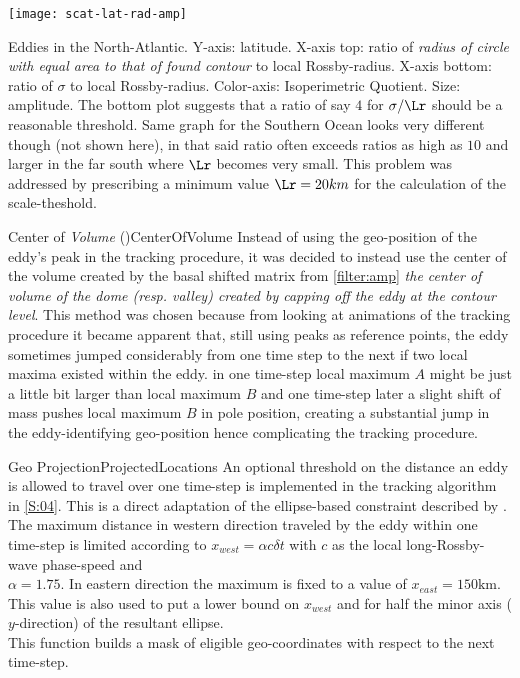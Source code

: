 \begin{marginfigure}
	\texttt{[image: scat-lat-rad-amp]}
	\caption{Eddies in the North-Atlantic. Y-axis: latitude. X-axis top: ratio of \textit{radius of circle with equal area to that of found contour} to local Rossby-radius.  X-axis bottom: ratio of $\sigma$ to local Rossby-radius. Color-axis: Isoperimetric Quotient. Size: amplitude. The bottom plot suggests that a ratio of say $4$ for $\sigma/\Lr$ should be a reasonable threshold. Same graph for the Southern Ocean looks very different though (not shown here), in that said ratio often exceeds ratios as high as $10$ and larger in the far south where $\Lr$ becomes very small. This problem was addressed by prescribing a minimum value $\Lr=20km$ for the calculation of the scale-theshold.   }
	\label{fig:scat-lat-rad-amp}
\end{marginfigure}
\begin{filter}{Center of \textit{Volume} (\CoV)}{CenterOfVolume}
\label{filter:CoV}
Instead of using the geo-position of the eddy's peak in the tracking procedure,
it was decided to instead use the center of the volume created by the basal
shifted matrix from \cref{filter:amp} \ie \textit{the center of volume of the
dome
(resp. valley) created by capping off the eddy at the contour level}.
This method was chosen because from looking at animations of the tracking
procedure
it became apparent that, still using peaks as reference points, the eddy
sometimes jumped considerably from one time step to the next if two local maxima
existed within the eddy. \Eg in one time-step local maximum $A$ might be just a
little bit larger than local maximum $B$ and one time-step later a slight shift
of mass pushes local maximum $B$ in pole position, creating a substantial jump
in the eddy-identifying geo-position hence complicating the tracking procedure.
\end{filter}\newline
\begin{filter}{Geo Projection}{ProjectedLocations}
\label{filter:projLocs}
An optional threshold on the distance an eddy is allowed to travel over one time-step is implemented in the tracking algorithm in \cref{S:04}. This is a direct adaptation of the ellipse-based constraint described by \citet{Chelton2011}. The maximum distance in western direction traveled by the eddy within one time-step is limited according to $x_{west} = \alpha c \delta{t} $ with $c$ as the local long-Rossby-wave phase-speed and \\ \eg $\alpha=1.75$. In eastern direction the maximum is fixed to a value of \eg $x_{east} = 150\mathrm{km}$. This value is also used to put a lower bound on $x_{west}$ and for half the minor axis ($y$-direction) of the resultant ellipse.   \\
This function builds a mask of eligible geo-coordinates with respect to the next time-step.
\end{filter}\newline

